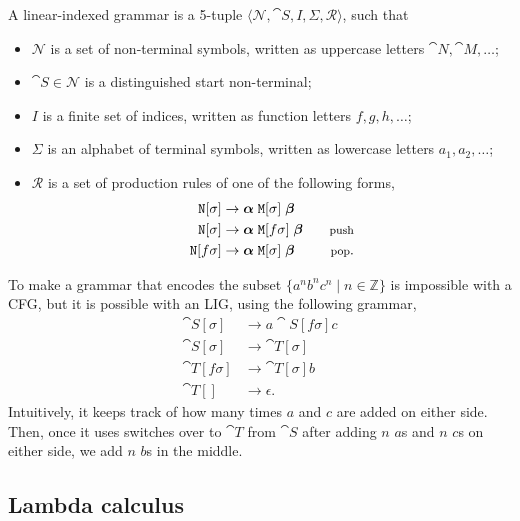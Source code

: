\begin{definition}
  A linear-indexed grammar is a 5-tuple $\langle \mathcal{N}, \cat{S}, I,
  \Sigma, \mathcal{R} \rangle$, such that
  \begin{itemize}
    \item $\mathcal{N}$ is a set of non-terminal symbols, written as uppercase
      letters $\cat{N},\cat{M},\ldots$;
    \item $\cat{S}\in\mathcal{N}$ is a distinguished start non-terminal;
    \item $I$ is a finite set of indices, written as function letters
      $f,g,h,\ldots$;
    \item $\Sigma$ is an alphabet of terminal symbols, written as lowercase
      letters $a_1,a_2,\ldots$;
    \item $\mathcal{R}$ is a set of production rules of one of the following
      forms,
      \begin{align*}
        \cat{N}[\sigma] &\to \bm{\alpha} \; \cat{M}[\sigma] \; \bm{\beta} \\
        \cat{N}[\sigma] &\to \bm{\alpha} \; \cat{M}[f\sigma] \; \bm{\beta} & \text{\footnotesize push} \\
        \cat{N}[f\sigma] &\to \bm{\alpha} \; \cat{M}[\sigma] \; \bm{\beta} & \text{\footnotesize pop}
      .\end{align*}
  \end{itemize}
\end{definition}

To make a grammar that encodes the subset $\{ a^n b^n c^n \mid n\in\mathbb{Z}
\}$ is impossible with a CFG, but it is possible with an LIG, using the
following grammar,
\begin{align*}
  \cat{S}[\sigma] &\to a \cat{S}[f\sigma] c \\
  \cat{S}[\sigma] &\to \cat{T}[\sigma] \\
  \cat{T}[f\sigma] &\to \cat{T}[\sigma] b \\
  \cat{T}[] &\to \epsilon
.\end{align*}
Intuitively, it keeps track of how many times $a$ and $c$ are added on either
side. Then, once it uses switches over to $\cat{T}$ from $\cat{S}$ after adding
$n$ $a$s and $n$ $c$s on either side, we add $n$ $b$s in the middle.

\subsection{Lambda calculus}

